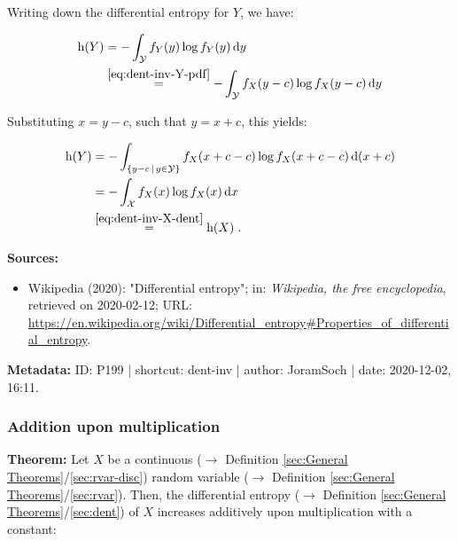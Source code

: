 \documentclass[a4paper,12pt,twoside]{book}
\begin{document}
Writing down the differential entropy for $Y$, we have:

\begin{equation} \label{eq:dent-inv-Y-dent-s1}
\begin{split}
\mathrm{h}(Y) &= - \int_{\mathcal{Y}} f_Y(y) \log f_Y(y) \, \mathrm{d}y \\
&\overset{\eqref{eq:dent-inv-Y-pdf}}{=} - \int_{\mathcal{Y}} f_X(y-c) \log f_X(y-c) \, \mathrm{d}y
\end{split}
\end{equation}

Substituting $x = y - c$, such that $y = x + c$, this yields:

\begin{equation} \label{eq:dent-inv-Y-dent-s2}
\begin{split}
\mathrm{h}(Y) &= - \int_{\left\lbrace y-c \,|\, y \in {\mathcal{Y}} \right\rbrace} f_X(x+c-c) \log f_X(x+c-c) \, \mathrm{d}(x+c) \\
&= - \int_{\mathcal{X}} f_X(x) \log f_X(x) \, \mathrm{d}x \\
&\overset{\eqref{eq:dent-inv-X-dent}}{=} \mathrm{h}(X) \; .
\end{split}
\end{equation}


\vspace{1em}
\textbf{Sources:}
\begin{itemize}
\item Wikipedia (2020): "Differential entropy"; in: \textit{Wikipedia, the free encyclopedia}, retrieved on 2020-02-12; URL: \url{https://en.wikipedia.org/wiki/Differential_entropy#Properties_of_differential_entropy}.
\end{itemize}


\vspace{1em}
\textbf{Metadata:} ID: P199 | shortcut: dent-inv | author: JoramSoch | date: 2020-12-02, 16:11.
\vspace{1em}



\subsubsection[\textbf{Addition upon multiplication}]{Addition upon multiplication} \label{sec:dent-add}
\setcounter{equation}{0}

\textbf{Theorem:} Let $X$ be a continuous ($\rightarrow$ Definition \ref{sec:General Theorems}/\ref{sec:rvar-disc}) random variable ($\rightarrow$ Definition \ref{sec:General Theorems}/\ref{sec:rvar}). Then, the differential entropy ($\rightarrow$ Definition \ref{sec:General Theorems}/\ref{sec:dent}) of $X$ increases additively upon multiplication with a constant:
\end{document}
